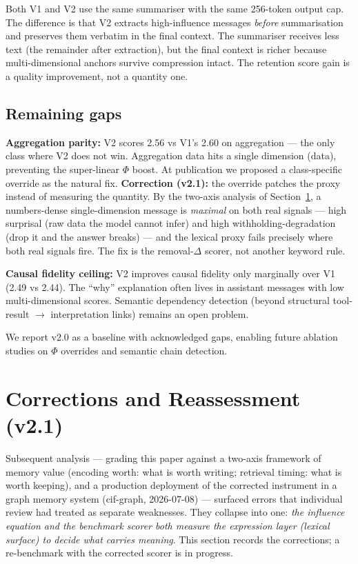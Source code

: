 \documentclass[11pt,a4paper]{article}
\begin{document}
\noindent Both V1 and V2 use the same summariser with the same 256-token output cap. The difference is that V2 extracts high-influence messages \emph{before} summarisation and preserves them verbatim in the final context. The summariser receives less text (the remainder after extraction), but the final context is richer because multi-dimensional anchors survive compression intact. The retention score gain is a quality improvement, not a quantity one.

\subsection{Remaining gaps}

\textbf{Aggregation parity:} V2 scores 2.56 vs V1's 2.60 on aggregation --- the only class where V2 does not win. Aggregation data hits a single dimension (data), preventing the super-linear $\Phi$ boost. At publication we proposed a class-specific override as the natural fix. \textbf{Correction (v2.1):} the override patches the proxy instead of measuring the quantity. By the two-axis analysis of Section~\ref{sec:corrections}, a numbers-dense single-dimension message is \emph{maximal} on both real signals --- high surprisal (raw data the model cannot infer) and high withholding-degradation (drop it and the answer breaks) --- and the lexical proxy fails precisely where both real signals fire. The fix is the removal-$\Delta$ scorer, not another keyword rule.

\textbf{Causal fidelity ceiling:} V2 improves causal fidelity only marginally over V1 (2.49 vs 2.44). The ``why'' explanation often lives in assistant messages with low multi-dimensional scores. Semantic dependency detection (beyond structural tool-result $\to$ interpretation links) remains an open problem.

We report v2.0 as a baseline with acknowledged gaps, enabling future ablation studies on $\Phi$ overrides and semantic chain detection.

\section{Corrections and Reassessment (v2.1)}
\label{sec:corrections}

Subsequent analysis --- grading this paper against a two-axis framework of memory value (encoding worth: what is worth writing; retrieval timing: what is worth keeping), and a production deployment of the corrected instrument in a graph memory system (cif-graph, 2026-07-08) --- surfaced errors that individual review had treated as separate weaknesses. They collapse into one: \emph{the influence equation and the benchmark scorer both measure the expression layer (lexical surface) to decide what carries meaning}. This section records the corrections; a re-benchmark with the corrected scorer is in progress.
\end{document}
